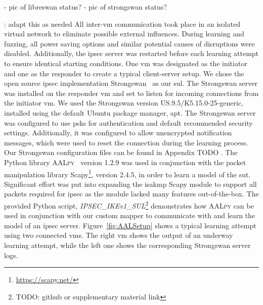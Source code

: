 - pic of libreswan status?
- pic of strongswan status?

\TODO: adapt this as needed
All inter-\ac{vm} communication took place in an isolated virtual network to eliminate possible external influences. During learning and fuzzing, all power saving options and similar potential causes of disruptions were disabled. Additionally, the \ac{ipsec} server was restarted before each learning attempt to ensure identical starting conditions. One \ac{vm} was designated as the initiator and one as the responder to create a typical client-server setup. We chose the open source \ac{ipsec} implementation Strongswan~\cite{software:strongswan} as our \ac{sul}. The Strongswan server was installed on the responder \ac{vm} and set to listen for incoming connections from the initiator \ac{vm}. We used the Strongswan version US.9.5/K5.15.0-25-generic, installed using the default Ubuntu package manager, apt. The Strongswan server was configured to use \acp{psk} for authentication and default recommended security settings. Additionally, it was configured to allow unencrypted notification messages, which were used to reset the connection during the learning process. Our Strongswan configuration files can be found in Appendix TODO . The Python library \textsc{AALpy}~\cite{software:aalpy} version 1.2.9 was used in conjunction with the packet manipulation library Scapy\footnote{\url{https://scapy.net/}}, version 2.4.5, in order to learn a model of the \ac{sut}. Significant effort was put into expanding the \ac{isakmp} Scapy module to support all packets required for \ac{ipsec} as the module lacked many features out-of-the-box. The provided Python script, \emph{IPSEC\_IKEv1\_SUL}\footnote{TODO: github or supplementary material link} demonstrates how \textsc{AALpy} can be used in conjunction with our custom mapper to communicate with and learn the model of an \ac{ipsec} server. Figure~\ref{fig:AALSetup} shows a typical learning attempt using two connected \acp{vm}. The right \ac{vm} shows the output of an underway learning attempt, while the left one shows the corresponding Strongswan server logs.
